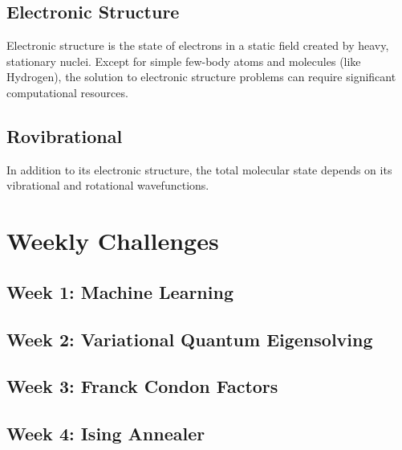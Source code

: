 \documentclass[12pt]{article}
\begin{document}
\subsection*{Electronic Structure}

Electronic structure is the state of electrons in a static field created by heavy, stationary nuclei.
Except for simple few-body atoms and molecules (like Hydrogen), the solution to electronic structure problems can require significant computational resources.

\subsection*{Rovibrational }

In addition to its electronic structure, the total molecular state depends on its vibrational and rotational wavefunctions.


\newpage

\section{Weekly Challenges}

\subsection{Week 1: Machine Learning}

\subsection{Week 2: Variational Quantum Eigensolving}

\subsection{Week 3: Franck Condon Factors}

\subsection{Week 4: Ising Annealer}

\newpage


\end{document}
